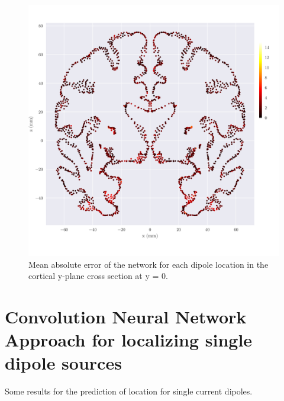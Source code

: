 \documentclass[a4paper, UKenglish, 11pt]{uiomaster}
\begin{document}
\begin{figure}[!htb]
    \centering
    \includegraphics[width=\linewidth]{../Finals/plots/simple_dipole_error_position.pdf}
    \caption{Mean absolute error of the network for each dipole location in the cortical y-plane cross section at y = 0.}
    \label{fig:single_dipole_accuracy}
\end{figure}




\section{Convolution Neural Network Approach for localizing single dipole sources}

Some results for the prediction of location for single current dipoles.
\end{document}
